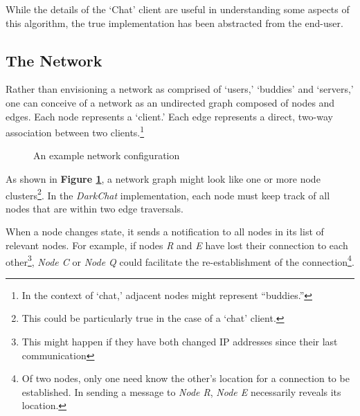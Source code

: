 \documentclass[11pt]{article}
\begin{document}
While the details of the `Chat' client are useful in understanding some aspects of this algorithm, the true implementation has been abstracted from the end-user. 

\subsection{The Network}

Rather than envisioning a network as comprised of `users,' `buddies' and `servers,' one can conceive of a network as an undirected graph composed of nodes and edges. Each node represents a `client.' Each edge represents a direct, two-way association between two clients.\footnote{In the context of `chat,' adjacent nodes might represent ``buddies.''}

\begin{figure}
  \caption{An example network configuration}
  \begin{center}
  \end{center}
\label{graph}
\end{figure}

As shown in {\bf Figure \ref{graph}}, a network graph might look like one or more node clusters\footnote{This could be particularly true in the case of a `chat' client.}. In the \emph{DarkChat} implementation, each node must keep track of all nodes that are within two edge traversals.

When a node changes state, it sends a notification to all nodes in its list of relevant nodes. For example, if nodes \emph{R} and \emph{E} have lost their connection to each other\footnote{This might happen if they have both changed IP addresses since their last communication}, \emph{Node C} or \emph{Node Q} could facilitate the re-establishment of the connection\footnote{Of two nodes, only one need know the other's location for a connection to be established. In sending a message to \emph{Node R}, \emph{Node E} necessarily reveals its location.}.
\end{document}
